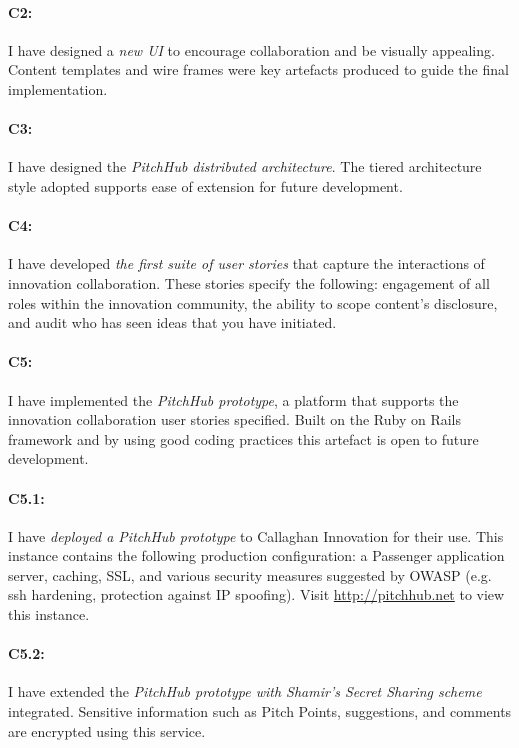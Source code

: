 \paragraph{C2:} I have designed a {\em new UI} to encourage collaboration and be visually appealing. Content templates and wire frames were key artefacts produced to guide the final implementation.

\paragraph{C3:} I have designed the {\em PitchHub distributed architecture}. The tiered architecture style adopted supports ease of extension for future development.

\paragraph{C4:} I have developed {\em the first suite of user stories} that capture the interactions of innovation collaboration. These stories specify the following: engagement of all roles within the innovation community, the ability to scope content's disclosure, and audit who has seen ideas that you have initiated.

\paragraph{C5:} I have implemented the {\em PitchHub prototype}, a platform that supports the innovation collaboration user stories specified. Built on the Ruby on Rails framework and by using good coding practices this artefact is open to future development.

\paragraph{C5.1:} I have {\em deployed a PitchHub prototype} to Callaghan Innovation for their use. This instance contains the following production configuration: a Passenger application server, caching, SSL, and various security measures suggested by OWASP (e.g. ssh hardening, protection against IP spoofing). Visit \url{http://pitchhub.net} to view this instance.


\paragraph{C5.2:} I have extended the {\em PitchHub prototype with Shamir's Secret Sharing scheme} integrated. Sensitive information such as Pitch Points, suggestions, and comments are encrypted using this service.

